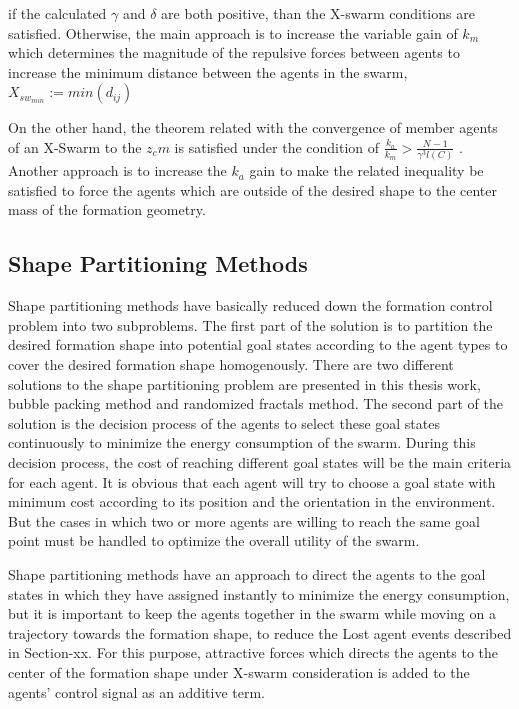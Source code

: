 if the calculated  $\gamma$ and $\delta$ are both positive, than the X-swarm conditions are satisfied. Otherwise, the main approach is to increase the variable gain of $k_m$ which determines the magnitude of the repulsive forces between agents to increase the minimum distance between the agents in the swarm, $X_{sw_{min}} := min(d_{ij})$
			
On the other hand, the theorem related with the convergence of member agents of an X-Swarm to the $z_cm$ is satisfied under the condition of $\frac{k_a}{k_m} > \frac{N-1}{\gamma^3  l(C)}$ . Another approach is to increase the $k_a$ gain to make the related inequality be satisfied to force the agents which are outside of the desired shape to the center mass of the formation geometry. 
					
\subsection{Shape Partitioning Methods}
Shape partitioning methods have basically reduced down the formation control problem into two subproblems. The first part of the solution is to partition the desired formation shape into potential goal states according to the agent types to cover the desired formation shape homogenously. There are two different solutions to the shape partitioning problem are presented in this thesis work, bubble packing method and randomized fractals method. The second part of the solution is the decision process of the agents to select these goal states continuously to minimize the energy consumption of the swarm. During this decision process, the cost of reaching different goal states will be the main criteria for each agent. It is obvious that each agent will try to choose a goal state with minimum cost according to its position and the orientation in the environment. But the cases in which two or more agents are willing to reach the same goal point must be handled to optimize the overall utility of the swarm. 

Shape partitioning methods have an approach to direct the agents to the goal states in which they have assigned instantly to minimize the energy consumption, but it is important to keep the agents together in the swarm while moving on a trajectory towards the formation shape, to reduce the Lost agent events described in Section-xx. For this purpose, attractive forces which directs the agents to the center of the formation shape under X-swarm consideration is added to the agents' control signal as an additive term. 
			
